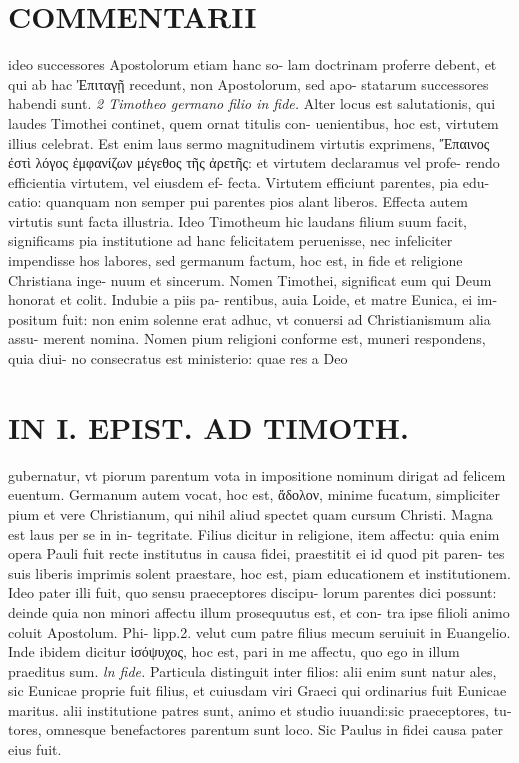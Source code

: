 \documentclass{article}
\begin{document}
\begin{pages}
\section*{COMMENTARII }
\marginpar{[ p.12 ]}\pstart ideo successores Apostolorum etiam hanc so- lam doctrinam proferre debent, et qui ab hac Ἐπιταγῇ  recedunt, non Apostolorum, sed apo- statarum successores habendi sunt.  \pend
\textit{2 Timotheo germano filio in fide. }\pstart Alter locus est salutationis, qui laudes Timothei continet, quem ornat titulis con- uenientibus, hoc est, virtutem illius celebrat. Est enim laus sermo magnitudinem virtutis exprimens, Ἔπαινος ἐστὶ λόγος ἐμφανίζων μέγεθος τῆς ἀρετῆς: et virtutem declaramus vel profe- rendo efficientia virtutem, vel eiusdem ef- fecta. Virtutem efficiunt parentes, pia edu- catio: quanquam non semper pui parentes pios alant liberos. Effecta autem virtutis sunt facta illustria. Ideo Timotheum hic laudans filium suum facit, significams pia institutione ad hanc felicitatem peruenisse, nec infeliciter impendisse hos labores, sed germanum factum, hoc est, in fide et religione Christiana inge- nuum et sincerum.  \pend\pstart Nomen Timothei, significat eum qui Deum honorat et colit. Indubie a piis pa- rentibus, auia Loide, et matre Eunica, ei im- positum fuit: non enim solenne erat adhuc, vt conuersi ad Christianismum alia assu- merent nomina. Nomen pium religioni conforme est, muneri respondens, quia diui- no consecratus est ministerio: quae res a Deo  \pend
\section*{IN I. EPIST. AD TIMOTH. }
\marginpar{[ p.13 ]}\pstart gubernatur, vt piorum parentum vota in impositione nominum dirigat ad felicem euentum.  \pend\pstart Germanum autem vocat, hoc est, ἄδολον, minime fucatum, simpliciter pium et vere Christianum, qui nihil aliud spectet quam cursum Christi. Magna est laus per se in in- tegritate.  \pend\pstart Filius dicitur in religione, item affectu: quia enim opera Pauli fuit recte institutus in causa fidei, praestitit ei id quod pit paren- tes suis liberis imprimis solent praestare, hoc est, piam educationem et institutionem. Ideo pater illi fuit, quo sensu praeceptores discipu- lorum parentes dici possunt: deinde quia non minori affectu illum prosequutus est, et con- tra ipse filioli animo coluit Apostolum. Phi- lipp.2. velut cum patre filius mecum seruiuit in Euangelio. Inde ibidem dicitur ἰσόψυχος, hoc est, pari in me affectu, quo ego in illum praeditus sum.  \pend
\textit{ln fide. }\pstart Particula distinguit inter filios: alii enim sunt natur ales, sic Eunicae proprie fuit filius, et cuiusdam viri Graeci qui ordinarius fuit Eunicae maritus. alii institutione patres sunt, animo et studio iuuandi:sic praeceptores, tu- tores, omnesque benefactores parentum sunt loco. Sic Paulus in fidei causa pater eius fuit.  \pend
\marginpar{[ p.14 ]}

\end{pages}
\end{document}
